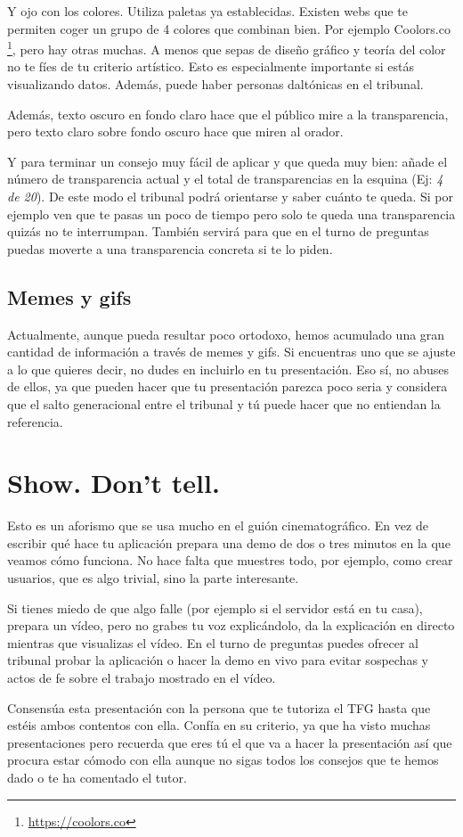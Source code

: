 Y ojo con los colores. Utiliza paletas ya establecidas. Existen webs que te permiten coger un grupo de 4 colores que combinan bien. Por ejemplo Coolors.co \footnote{\url{https://coolors.co}}, pero hay otras muchas. A menos que sepas de diseño gráfico y teoría del color no te fíes de tu criterio artístico. Esto es especialmente importante si estás visualizando datos. Además, puede haber personas daltónicas en el tribunal.

Además, texto oscuro en fondo claro hace que el público mire a la transparencia, pero texto claro sobre fondo oscuro hace que miren al orador.

Y para terminar un consejo muy fácil de aplicar y que queda muy bien: añade el número de transparencia actual y el total de transparencias en la esquina (Ej: \textit{4 de 20}). De este modo el tribunal podrá orientarse y saber cuánto te queda. Si por ejemplo ven que te pasas un poco de tiempo pero solo te queda una transparencia quizás no te interrumpan. También servirá para que en el turno de preguntas puedas moverte a una transparencia concreta si te lo piden.

\subsection{Memes y gifs}

Actualmente, aunque pueda resultar poco ortodoxo, hemos acumulado una gran cantidad de información a través de memes y gifs. Si encuentras uno que se ajuste a lo que quieres decir, no dudes en incluirlo en tu presentación. Eso sí, no abuses de ellos, ya que pueden hacer que tu presentación parezca poco seria y considera que el salto generacional entre el tribunal y tú puede hacer que no entiendan la referencia. 

\section{Show. Don't tell.}

Esto es un aforismo que se usa mucho en el guión cinematográfico. En vez de escribir qué hace tu aplicación prepara una demo de dos o tres minutos en la que veamos cómo funciona. No hace falta que muestres todo, por ejemplo, como crear usuarios, que es algo trivial, sino la parte interesante.

Si tienes miedo de que algo falle (por ejemplo si el servidor está en tu casa), prepara un vídeo, pero no grabes tu voz explicándolo, da la explicación en directo mientras que visualizas el vídeo. En el turno de preguntas puedes ofrecer al tribunal probar la aplicación o hacer la demo en vivo para evitar sospechas y actos de fe sobre el trabajo mostrado en el vídeo.

Consensúa esta presentación con la persona que te tutoriza el TFG hasta que estéis ambos contentos con ella. Confía en su criterio, ya que ha visto muchas presentaciones pero recuerda que eres tú el que va a hacer la presentación así que procura estar cómodo con ella aunque no sigas todos los consejos que te hemos dado o te ha comentado el tutor.


